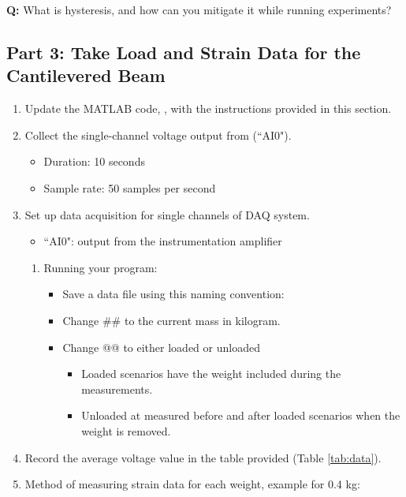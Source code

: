 \documentclass{article} %
\begin{document}
\textbf{Q:} What is hysteresis, and how can you mitigate it while running experiments?  \\

\subsection{Part 3: Take Load and Strain Data for the Cantilevered Beam}
\begin{enumerate}
    \item Update the MATLAB code, , with the instructions provided in this section.
    \item Collect the single-channel voltage output from (``AI0").
    \begin{itemize}
        \item Duration: 10 seconds
        \item Sample rate: 50 samples per second
    \end{itemize}
    \item Set up data acquisition for single channels of DAQ system.
    \begin{itemize}
        \item ``AI0": output from the instrumentation amplifier
    \end{itemize}
    \begin{enumerate}[label=\alph*.]
        \item Running your program:
        \begin{itemize}
            \item Save a data file using this naming convention: 
            \item Change \#\# to the current mass in kilogram.
            \item Change @@ to either loaded or unloaded
            \begin{itemize}
                \item Loaded scenarios have the weight included during the measurements.
                \item Unloaded at measured before and after loaded scenarios when the weight is removed.
            \end{itemize}
        \end{itemize}
    \end{enumerate}
    \item Record the average voltage value in the table provided (Table \ref{tab:data}).
    \item Method of measuring strain data for each weight, example for 0.4 kg:

\end{enumerate}
\end{document}
